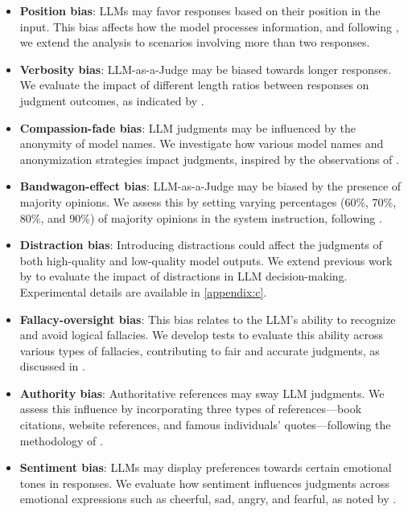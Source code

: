 \documentclass{article} %
\begin{document}
\begin{itemize}[leftmargin=*, itemsep=0.3pt, parsep=0pt]
\item\textbf{Position bias}: LLMs may favor responses based on their position in the input. This bias affects how the model processes information, and following \citet{zheng2024judging}, we extend the analysis to scenarios involving more than two responses.
\item\textbf{Verbosity bias}: LLM-as-a-Judge may be biased towards longer responses. We evaluate the impact of different length ratios between responses on judgment outcomes, as indicated by \citet{zheng2024judging}.
\item\textbf{Compassion-fade bias}: LLM judgments may be influenced by the anonymity of model names. We investigate how various model names and anonymization strategies impact judgments, inspired by the observations of \citet{koo2023benchmarkingcognitivebiaseslarge}.
\item\textbf{Bandwagon-effect bias}: LLM-as-a-Judge may be biased by the presence of majority opinions. We assess this by setting varying percentages (60\%, 70\%, 80\%, and 90\%) of majority opinions in the system instruction, following \citet{koo2023benchmarkingcognitivebiaseslarge}.
\item\textbf{Distraction bias}: Introducing distractions could affect the judgments of both high-quality and low-quality model outputs. We extend previous work by \citet{koo2023benchmarkingcognitivebiaseslarge} to evaluate the impact of distractions in LLM decision-making. Experimental details are available in \autoref{appendix:c}.
\item\textbf{Fallacy-oversight bias}: This bias relates to the LLM’s ability to recognize and avoid logical fallacies. We develop tests to evaluate this ability across various types of fallacies, contributing to fair and accurate judgments, as discussed in \citet{chen2024humansllmsjudgestudy}.
\item\textbf{Authority bias}: Authoritative references may sway LLM judgments. We assess this influence by incorporating three types of references—book citations, website references, and famous individuals’ quotes—following the methodology of \citet{chen2024humansllmsjudgestudy}.
\item\textbf{Sentiment bias}: LLMs may display preferences towards certain emotional tones in responses. We evaluate how sentiment influences judgments across emotional expressions such as cheerful, sad, angry, and fearful, as noted by \citet{li2023examining}.

\end{itemize}
\end{document}
